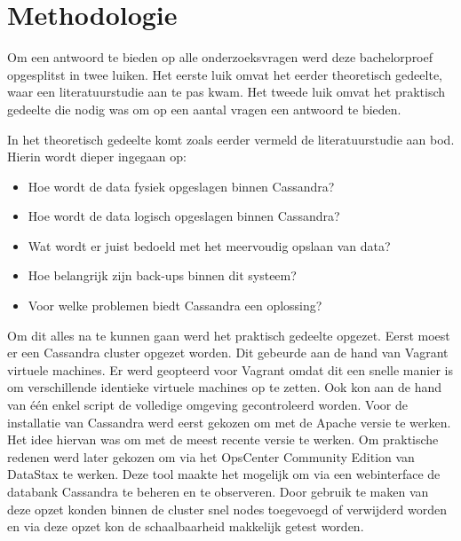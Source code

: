 \chapter{Methodologie}
\label{ch:methodologie}


Om een antwoord te bieden op alle onderzoeksvragen werd deze bachelorproef opgesplitst in twee luiken.
Het eerste luik omvat het eerder theoretisch gedeelte, waar een literatuurstudie aan te pas kwam.
Het tweede luik omvat het praktisch gedeelte die nodig was om op een aantal vragen een antwoord te bieden.

In het theoretisch gedeelte komt zoals eerder vermeld de literatuurstudie aan bod.
Hierin wordt dieper ingegaan op: 
\begin{itemize} 
	\item Hoe wordt de data fysiek opgeslagen binnen Cassandra?
	\item Hoe wordt de data logisch opgeslagen binnen Cassandra?
	\item Wat wordt er juist bedoeld met het meervoudig opslaan van data?
	\item Hoe belangrijk zijn back-ups binnen dit systeem?
	\item Voor welke problemen biedt Cassandra een oplossing?
\end{itemize}

Om dit alles na te kunnen gaan werd het praktisch gedeelte opgezet.
Eerst moest er een Cassandra cluster opgezet worden.
Dit gebeurde aan de hand van Vagrant virtuele machines.
Er werd geopteerd voor Vagrant omdat dit een snelle manier is om verschillende identieke virtuele machines op te zetten.
Ook kon aan de hand van één enkel script de volledige omgeving gecontroleerd worden.
Voor de installatie van Cassandra werd eerst gekozen om met de Apache versie te werken.
Het idee hiervan was om met de meest recente versie te werken.
Om praktische redenen werd later gekozen om via het OpsCenter Community Edition van DataStax te werken.
Deze tool maakte het mogelijk om via een webinterface de databank Cassandra te beheren en te observeren.
Door gebruik te maken van deze opzet konden binnen de cluster snel nodes toegevoegd of verwijderd worden en via deze opzet kon de schaalbaarheid makkelijk getest worden.

